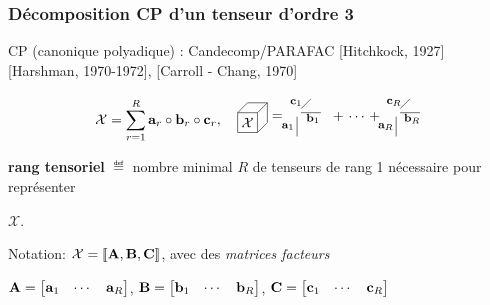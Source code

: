 \documentclass[9pt]{beamer}
\newcommand{\cpd}[3]{[\![#1, #2,#3]\!]}
\begin{document}
\begin{frame}
\frametitle{Décomposition CP d'un tenseur d'ordre 3}

CP (canonique polyadique) : Candecomp/PARAFAC
[Hitchkock, 1927] [Harshman, 1970-1972], [Carroll - Chang, 1970]

\[
\calX = \sum\limits_{r=1}^{R} \bfa_r \circ \bfb_r \circ \bfc_r, 
\quad 
\raisebox{-0.3\height}{\begin{tikzpicture}
\begin{scope}[scale= 0.5]
\draw(0.5,0.5) node (A) {$\mathcal{X}$};
\draw(0,0) rectangle (1,1);
\draw(0,1) -- (0.5,1.5) -- (1.5,1.5) -- (1.5,0.5) --(1,0);
\draw(1,1) -- (1.5,1.5);

\draw(2,0.8) node (eq) {$=$};
\draw(6,0.8) node (eq) {$\quad+\,\cdots\,+\quad$};
\end{scope}

\begin{scope}[scale= 0.5,xshift=1cm]
\draw(2,-0.2) -- (2,0.8);
\draw(2.1,0.3) node[anchor=east] (s21) {\small {\footnotesize$\bfa_1$}};
\draw(2.2,1) -- (3.2,1);
\draw(2.8,1.2) node[anchor=north] (s22) {\small {\footnotesize$\bfb_1$}};
\draw(2.2,1.2) -- (2.7,1.7);
\draw(2.5,1.1) node[anchor=south east] (s23) {\small{\footnotesize$\bfc_1$}};
\end{scope}

\begin{scope}[scale= 0.5,xshift=6cm]
\draw(2,-0.2) -- (2,0.8);
\draw(2.1,0.3) node[anchor=east] (s21) {\small {\footnotesize$\bfa_R$}};
\draw(2.2,1) -- (3.2,1);
\draw(2.8,1.2) node[anchor=north] (s22) {\small {\footnotesize$\bfb_R$}};
\draw(2.2,1.2) -- (2.7,1.7);
\draw(2.5,1.1) node[anchor=south east] (s23) {\small {\footnotesize$\bfc_R$}};
\end{scope}
\end{tikzpicture}}
\]

\begin{tcolorbox}[width=\textwidth]
\textbf{rang tensoriel}  $\eqdef$ nombre minimal $R$ de tenseurs de rang 1 nécessaire pour représenter 

\hfill $\mathcal{X}$.
\end{tcolorbox}
 
  
 \vspace{2em}
 
Notation:  $\mathcal{X} = \cpd{\matr{A}}{\matr{B}}{\matr{C}}$, avec des \emph{matrices facteurs}

$\mathbf{A} = \begin{bmatrix}\mathbf{a}_1 & \cdots & \mathbf{a}_R \end{bmatrix}$, $\mathbf{B} = \begin{bmatrix}\mathbf{b}_1 & \cdots & \mathbf{b}_R \end{bmatrix}$, $\mathbf{C} = \begin{bmatrix}\mathbf{c}_1 & \cdots & \mathbf{c}_R \end{bmatrix}$ 
\vspace*{1cm}
\end{frame}
\end{document}
